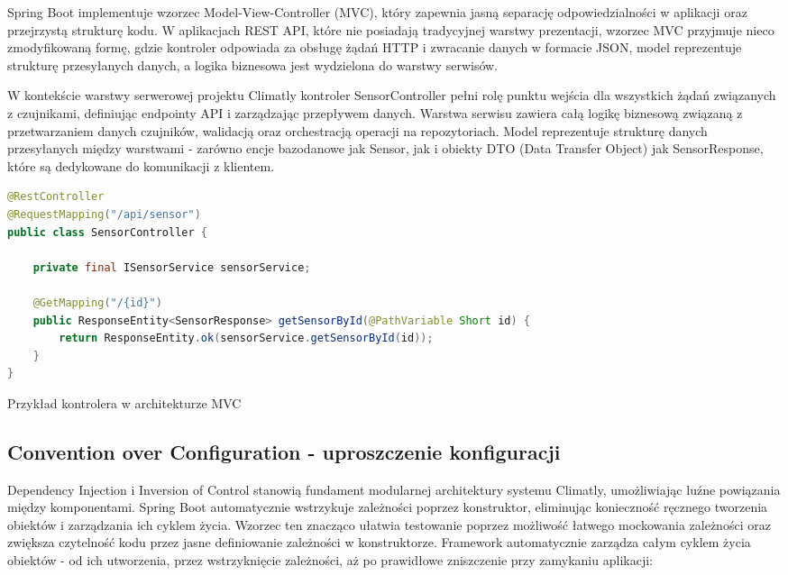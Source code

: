 \documentclass[a4paper,12pt,openany]{book}
\begin{document}
Spring Boot implementuje wzorzec Model-View-Controller (MVC), który zapewnia jasną separację odpowiedzialności w aplikacji oraz przejrzystą strukturę kodu. W aplikacjach REST API, które nie posiadają tradycyjnej warstwy prezentacji, wzorzec MVC przyjmuje nieco zmodyfikowaną formę, gdzie kontroler odpowiada za obsługę żądań HTTP i zwracanie danych w formacie JSON, model reprezentuje strukturę przesyłanych danych, a logika biznesowa jest wydzielona do warstwy serwisów.

W kontekście warstwy serwerowej projektu Climatly kontroler SensorController pełni rolę punktu wejścia dla wszystkich żądań związanych z czujnikami, definiując endpointy API i zarządzając przepływem danych. Warstwa serwisu zawiera całą logikę biznesową związaną z przetwarzaniem danych czujników, walidacją oraz orchestracją operacji na repozytoriach. Model reprezentuje strukturę danych przesyłanych między warstwami - zarówno encje bazodanowe jak Sensor, jak i obiekty DTO (Data Transfer Object) jak SensorResponse, które są dedykowane do komunikacji z klientem.

\begin{lstfloat}[htbp]
\begin{lstlisting}[language=java]
@RestController
@RequestMapping("/api/sensor")
public class SensorController {

    private final ISensorService sensorService;

    @GetMapping("/{id}")
    public ResponseEntity<SensorResponse> getSensorById(@PathVariable Short id) {
        return ResponseEntity.ok(sensorService.getSensorById(id));
    }
}
\end{lstlisting}
\caption{Przykład kontrolera w architekturze MVC}
\label{lst:sensor-controller-mvc}
\end{lstfloat}

\subsection*{Convention over Configuration - uproszczenie konfiguracji}

Dependency Injection i Inversion of Control stanowią fundament modularnej architektury systemu Climatly, umożliwiając luźne powiązania między komponentami. Spring Boot automatycznie wstrzykuje zależności poprzez konstruktor, eliminując konieczność ręcznego tworzenia obiektów i zarządzania ich cyklem życia. Wzorzec ten znacząco ułatwia testowanie poprzez możliwość łatwego mockowania zależności oraz zwiększa czytelność kodu przez jasne definiowanie zależności w konstruktorze. Framework automatycznie zarządza całym cyklem życia obiektów - od ich utworzenia, przez wstrzyknięcie zależności, aż po prawidłowe zniszczenie przy zamykaniu aplikacji:
\end{document}
